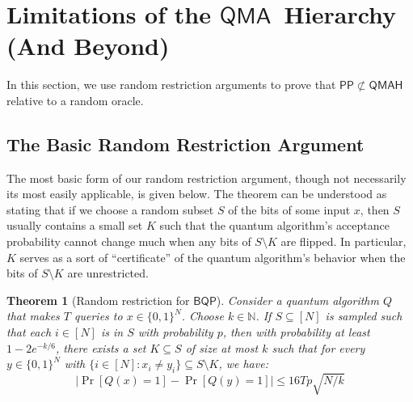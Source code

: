 \documentclass[11pt]{article}%
\newtheorem{theorem}{Theorem}
\newcommand{\Naturals}{\mathbb{N}}
\begin{document}
\section{Limitations of the \texorpdfstring{$\mathsf{QMA}$}{QMA}\ Hierarchy (And Beyond)}
In this section, we use random restriction arguments to prove that $\mathsf{PP} \not\subset \mathsf{QMAH}$ relative to a random oracle.

\subsection{The Basic Random Restriction Argument}
The most basic form of our random restriction argument, though not necessarily its most easily applicable, is given below. The theorem can be understood as stating that if we choose a random subset $S$ of the bits of some input $x$, then $S$ usually contains a small set $K$ such that the quantum algorithm's acceptance probability cannot change much when any bits of $S \setminus K$ are flipped. In particular, $K$ serves as a sort of ``certificate'' of the quantum algorithm's behavior when the bits of $S \setminus K$ are unrestricted.

\begin{theorem}[Random restriction for $\mathsf{BQP}$]
\label{thm:bqp_random_restriction}
Consider a quantum algorithm $Q$ that makes $T$ queries to $x \in \{0,1\}^N$. Choose $k \in \Naturals$. If $S \subseteq [N]$ is sampled such that each $i \in [N]$ is in $S$ with probability $p$, then with probability at least $1 - 2e^{-k/6}$, there exists a set $K \subseteq S$ of size at most $k$ such that for every $y \in \{0,1\}^N$ with $\{i \in [N] : x_i \neq y_i\} \subseteq S \setminus K$, we have:
\[ \left|\Pr\left[Q(x) = 1 \right] - \Pr\left[Q(y) = 1 \right] \right| \le 16Tp\sqrt{N/k}\]
\end{theorem}
\end{document}
